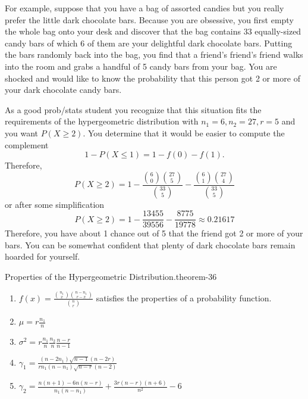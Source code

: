 \documentclass[10pt,]{book}
\numberwithin{equation}{section}
\begin{document}
%
\par
\hypertarget{p-842}{}%
For example, suppose that you have a bag of assorted candies but you really prefer the little dark chocolate bars. Because you are obsessive, you first empty the whole bag onto your desk and discover that the bag contains 33 equally-sized candy bars of which 6 of them are your delightful dark chocolate bars. Putting the bars randomly back into the bag, you find that a friend's friend's friend walks into the room and grabs a handful of 5 candy bars from your bag. You are shocked and would like to know the probability that this person got 2 or more of your dark chocolate candy bars.%
\par
\hypertarget{p-843}{}%
As a good prob/stats student you recognize that this situation fits the requirements of the hypergeometric distribution with \(n_1 = 6, n_2 = 27, r=5\) and you want \(P(X \ge 2)\).  You determine that it would be easier to compute the complement%
\begin{equation*}
1 - P(X \le 1) = 1 - f(0) - f(1).
\end{equation*}
Therefore,%
\begin{equation*}
P (X \ge 2) = 1 - \frac{\binom{6}{0} \binom{27}{5}}{\binom{33}{5}} - \frac{\binom{6}{1} \binom{27}{4}}{\binom{33}{5}}
\end{equation*}
or after some simplification%
\begin{equation*}
P (X \ge 2) = 1 - \frac{13455}{39556} - \frac{8775}{19778} \approx 0.21617
\end{equation*}
Therefore, you have about 1 chance out of 5 that the friend got 2 or more of your bars. You can be somewhat confident that plenty of dark chocolate bars remain hoarded for yourself.%
\par
\hypertarget{p-844}{}%
\begin{theorem}{Properties of the Hypergeometric Distribution.}{}{theorem-36}%
\hypertarget{HypergeometricProperties}{}%
\leavevmode%
\begin{enumerate}
\item\hypertarget{li-218}{}\(f(x) = \frac{\binom{n_1}{x} \binom{n-n_1}{r-x}}{\binom{n}{r}}\) satisfies the properties of a probability function.%
\item\hypertarget{li-219}{}\(\mu = r \frac{n_1}{n}\)%
\item\hypertarget{li-220}{}\(\sigma^2 = r \frac{n_1}{n} \frac{n_2}{n} \frac{n-r}{n-1}\)%
\item\hypertarget{li-221}{}\(\gamma_1 = \frac{(n - 2 n_1)\sqrt{n-1}(n - 2r)}{r n_1 (n - n_1) \sqrt{n-r}(n-2)}\)%
\item\hypertarget{li-222}{}\(\gamma_2 = \frac{n(n+1)-6n(n-r)}{n_1(n-n_1)} + \frac{3r(n-r)(n+6)}{n^2} - 6\)%
\end{enumerate}
%
\end{theorem}
\end{document}
